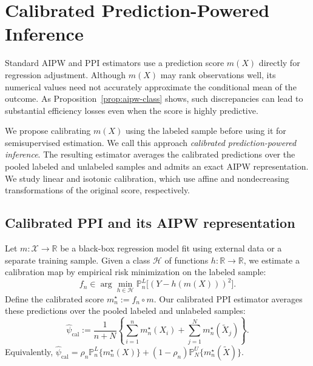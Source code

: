 \documentclass{article}
\theoremstyle{plain}
\theoremstyle{definition}
\newcommand{\1}{\mathbbm{1}}
\newcommand{\psihat}{\widehat{\psi}_{\mathrm{cal}}}
\newcommand{\rhon}{\rho_n}
\newcommand{\mtilde}{m_n^\star}
\newcommand{\Pl}{\mathbb{P}^{L}_n}
\newcommand{\Pu}{\mathbb{P}^{U}_N}
\begin{document}
\section{Calibrated Prediction-Powered Inference}
\label{sec:calppi}

Standard AIPW and PPI estimators use a prediction score $m(X)$
directly for regression adjustment. Although $m(X)$ may rank
observations well, its numerical values need not accurately
approximate the conditional mean of the outcome. As
Proposition~\ref{prop:aipw-class} shows, such discrepancies
can lead to substantial efficiency losses even when the score
is highly predictive.

We propose calibrating $m(X)$ using the labeled sample before
using it for semisupervised estimation. We call this approach
\emph{calibrated prediction-powered inference}. The resulting
estimator averages the calibrated predictions over the pooled
labeled and unlabeled samples and admits an exact AIPW
representation. We study linear and isotonic calibration,
which use affine and nondecreasing transformations of the
original score, respectively.

\subsection{Calibrated PPI and its AIPW representation}

Let $m:\mathcal X\to\mathbb R$ be a black-box regression model
fit using external data or a separate training sample.
Given a class $\mathcal H$ of functions $h:\mathbb R\to\mathbb R$,
we estimate a calibration map by empirical risk minimization
on the labeled sample:
\begin{equation}
\label{eq:H-erm}
f_n \in \arg\min_{h\in\mathcal H}
\Pl\bigl[(Y-h(m(X)))^2\bigr].
\end{equation}
Define the calibrated score $\mtilde:=f_n\circ m$.
Our calibrated PPI estimator averages these predictions
over the pooled labeled and unlabeled samples:
\begin{equation}
\label{eq:plugin}
\psihat
:=
\frac{1}{n+N}\left\{
\sum_{i=1}^n \mtilde(X_i)
+
\sum_{j=1}^N \mtilde(\widetilde X_j)
\right\}.
\end{equation}
Equivalently,
$\psihat
=
\rhon\Pl\{\mtilde(X)\}
+
(1-\rhon)\Pu\{\mtilde(\widetilde X)\}$.
\end{document}
